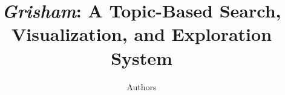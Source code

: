 \documentclass[letterpaper]{article}
\newcommand{\system}{\textsl{Grisham}\xspace}
\begin{document}
\title{\system: A Topic-Based Search, Visualization, and Exploration System}
\author{Authors}
\maketitle














\end{document}
